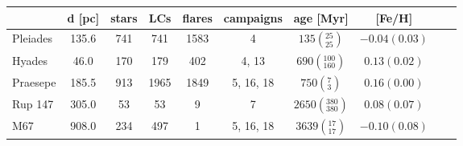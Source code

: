\begin{tabular}{lccccccccr}
\hline
          &  d [pc] &  stars &   LCs &  flares &    campaigns &                        age [Myr] &         [Fe/H] \\
\hline
 Pleiades &   135.6 &    741 &   741 &    1583 &            4 &     $135\left(_{25}^{25}\right)$ &  $-0.04(0.03)$ \\
   Hyades &    46.0 &    170 &   179 &     402 &       4, 13 &   $690\left(_{160}^{100}\right)$ &   $0.13(0.02)$ \\
 Praesepe &   185.5 &    913 &  1965 &    1849 &   5, 16, 18 &       $750\left(_{3}^{7}\right)$ &   $0.16(0.00)$ \\
  Rup 147 &   305.0 &     53 &    53 &       9 &            7 &  $2650\left(_{380}^{380}\right)$ &   $0.08(0.07)$ \\
      M67 &   908.0 &    234 &   497 &       1 &   5, 16, 18 &    $3639\left(_{17}^{17}\right)$ &  $-0.10(0.08)$ \\
\hline

\end{tabular}
